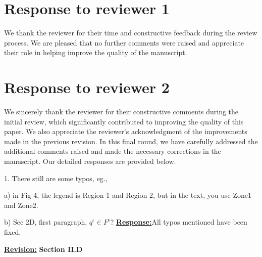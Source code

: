 \documentclass{article}
\newcommand{\re}{\tcblower \underline{\textbf{Response:}}\quad}
\newcommand{\rv}{{\large{\underline{\textbf{Revision:}}}}\quad}
\begin{document}
\section{Response to reviewer 1}
\begin{cmt*}{}{}
We thank the reviewer for their time and constructive feedback during the review process. We are pleased that no further comments were raised and appreciate their role in helping improve the quality of the manuscript.
\end{cmt*}
\vspace{0.2cm}
\section{Response to reviewer 2} 
\begin{cmt*}{}{}
We sincerely thank the reviewer for their constructive comments during the initial review, which significantly contributed to improving the quality of this paper. We also appreciate the reviewer’s acknowledgment of the improvements made in the previous revision. In this final round, we have carefully addressed the additional comments raised and made the necessary corrections in the manuscript. Our detailed responses are provided below.
\end{cmt*}
\vspace{0.1cm}
\begin{cmt}{}{}        %
1. There still are some typos, eg., 

   a) in Fig 4, the legend is Region 1 and Region 2, but in the text,
you use Zone1 and Zone2.

   b) Sec 2D, first paragraph, $q^{\epsilon} \in F^{\epsilon}$?
	\re All typos mentioned have been fixed.
\end{cmt}
\rv 
\textbf{Section II.D}
\end{document}
